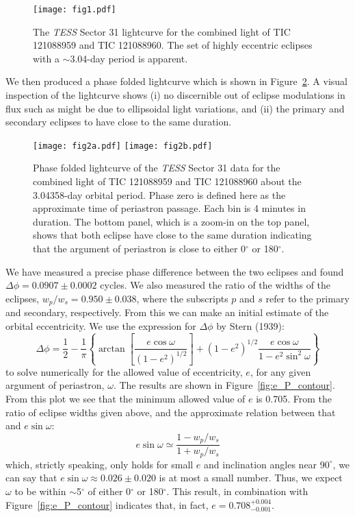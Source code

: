 \documentclass[fleqn,usenatbib]{mnras} %
\begin{document}
\begin{figure}
\texttt{[image: fig1.pdf]}
\vspace{-5mm}
\caption{The {\em TESS} Sector 31 lightcurve for the combined light of TIC 121088959 and TIC 121088960.  The set of highly eccentric eclipses with a $\sim$3.04-day period is apparent.}
\label{fig:fullLC}
\end{figure}

\indent We then produced a phase folded lightcurve which is shown in Figure~\ref{fig:fold}. A visual inspection of the lightcurve shows (i) no discernible out of eclipse modulations in flux such as might be due to ellipsoidal light variations, and (ii) the primary and secondary eclipses to have close to the same duration.

\begin{figure}
\texttt{[image: fig2a.pdf]}
\texttt{[image: fig2b.pdf]}
\vspace{-5mm}
\caption{Phase folded lightcurve of the {\em TESS} Sector 31 data for the combined light of TIC 121088959 and TIC 121088960 about the 3.04358-day orbital period. Phase zero is defined here as the approximate time of periastron passage. Each bin is 4 minutes in duration. The bottom panel, which is a zoom-in on the top panel, shows that both eclipse have close to the same duration indicating that the argument of periastron is close to either 0$^\circ$ or 180$^\circ$.}
\label{fig:fold}
\end{figure}

We have measured a precise phase difference between the two eclipses and found $\Delta \phi = 0.0907 \pm 0.0002$ cycles. We also measured the ratio of the widths of the eclipses, $w_p/w_s = 0.950 \pm 0.038$, where the subscripts $p$ and $s$ refer to the primary and secondary, respectively. From this we can make an initial estimate of the orbital eccentricity.  We use the expression for $\Delta \phi$ by Stern (1939):
\begin{equation}
\Delta \phi = \frac{1}{2}-\frac{1}{\pi}\left\{\arctan\left[\frac{e \cos \omega}{(1-e^2)^{1/2}}\right]+(1-e^2)^{1/2} \frac{e \cos \omega}{1-e^2 \sin^2 \omega} \right\}
\label{eqn:sterne}
\end{equation}
to solve numerically for the allowed value of eccentricity, $e$, for any given argument of periastron, $\omega$.  The results are shown in Figure~\ref{fig:e_P_contour}. From this plot we see that the minimum allowed value of $e$ is 0.705.  From the ratio of eclipse widths given above, and the approximate relation between that and $e \sin \omega$:
\begin{equation}
e \sin \omega \simeq \frac{1-w_p/w_s}{1+w_p/w_s}
\label{eqn:esinw}
\end{equation}
which, strictly speaking, only holds for small $e$ and inclination angles near $90^\circ$, we can say that $e \sin \omega \approx 0.026 \pm 0.020$ is at most a small number.  Thus, we expect $\omega$ to be within $\sim$5$^\circ$ of either 0$^\circ$ or 180$^\circ$.  This result, in combination with Figure~\ref{fig:e_P_contour} indicates that, in fact, $e=0.708^{+0.004}_{-0.001}$.
\end{document}
